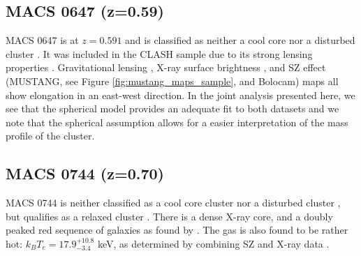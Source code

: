 \documentclass[iop,numberedappendix,apj]{emulateapj}
\begin{document}


\subsection{MACS 0647 (z=0.59)}
\label{sec:results_m0647}


MACS 0647 is at $z = 0.591$ and is classified as neither a cool core nor a disturbed cluster \citep{sayers2013}. 
It was included in the CLASH sample due to its strong lensing properties \citep{postman2012}.
Gravitational lensing \citep{zitrin2011}, X-ray surface brightness \citep{mann2012}, 
and SZ effect (MUSTANG, see Figure \ref{fig:mustang_maps_sample}, and Bolocam) maps all
show elongation in an east-west direction. 
In the joint analysis presented here, we see that the spherical model provides an adequate fit to both datasets and we note 
that the spherical assumption allows for a easier interpretation of the mass profile of the cluster.


\subsection{MACS 0744 (z=0.70)}
\label{sec:results_m0744}


MACS 0744 is neither classified as a cool core cluster nor a disturbed cluster \citep{mann2012,sayers2013}, but qualifies
as a relaxed cluster \citep{mann2012}. There is a dense X-ray core, and a doubly peaked red sequence of galaxies as found
by \citet{kartaltepe2008}. The gas is also found to be rather hot: $k_B T_e = 17.9_{-3.4}^{+10.8}$ keV, as determined by combining
SZ and X-ray data \citep{laroque2003}. 
\end{document}
